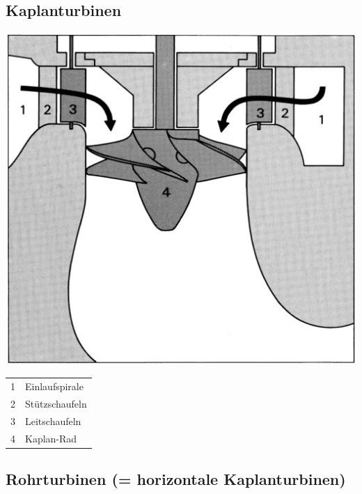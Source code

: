 \subsection{Kaplanturbinen}

\begin{minipage}[c]{0.48\columnwidth}
    \includegraphics[width=0.98\columnwidth, align=c]{images/Kaplan_Turbine.png}    
\end{minipage}
\hfill
\begin{minipage}[t]{0.48\columnwidth}
    \begin{tabular}{c l}
        1 & Einlaufspirale \\
        2 & Stützschaufeln \\
        3 & Leitschaufeln \\
        4 & Kaplan-Rad \\
\end{tabular}  
\end{minipage}



\subsection{Rohrturbinen (= horizontale Kaplanturbinen)}

